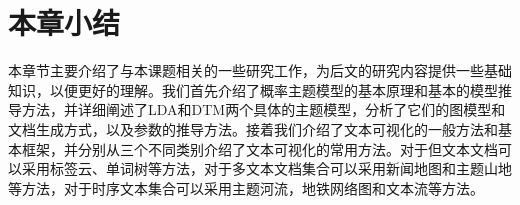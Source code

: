\section{本章小结}
本章节主要介绍了与本课题相关的一些研究工作，为后文的研究内容提供一些基础知识，以便更好的理解。我们首先介绍了概率主题模型的基本原理和基本的模型推导方法，并详细阐述了LDA\cite{Blei:2003}和DTM\cite{Blei:2006}两个具体的主题模型，分析了它们的图模型和文档生成方式，以及参数的推导方法。接着我们介绍了文本可视化的一般方法和基本框架，并分别从三个不同类别介绍了文本可视化的常用方法。对于但文本文档可以采用标签云、单词树等方法，对于多文本文档集合可以采用新闻地图和主题山地等方法，对于时序文本集合可以采用主题河流，地铁网络图和文本流等方法。



